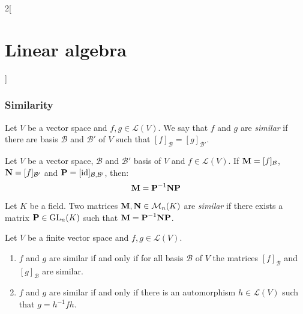\documentclass[../../../main.tex]{subfiles}
\begin{document}
\begin{multicols}{2}[\section{Linear algebra}]
  \subsubsection{Similarity}
  \begin{definition}
    Let $V$ be a vector space and $f,g\in\mathcal{L}(V)$. We say that $f$ and $g$ are \emph{similar} if there are basis $\mathcal{B}$ and $\mathcal{B}'$ of $V$ such that $[f]_\mathcal{B}=[g]_{\mathcal{B}'}$.
  \end{definition}
  \begin{lemma}
    Let $V$ be a vector space, $\mathcal{B}$ and $\mathcal{B}'$ basis of $V$ and $f\in\mathcal{L}(V)$. If $\boldsymbol{\mathrm{M}}=[f]_\mathcal{B}$, $\boldsymbol{\mathrm{N}}=[f]_{\mathcal{B}'}$ and $\boldsymbol{\mathrm{P}}=[\mathrm{id}]_{\mathcal{B},\mathcal{B}'}$, then: $$\boldsymbol{\mathrm{M}}=\boldsymbol{\mathrm{P}}^{-1}\boldsymbol{\mathrm{N}}\boldsymbol{\mathrm{P}}$$
  \end{lemma}
  \begin{definition}
    Let $K$ be a field. Two matrices $\boldsymbol{\mathrm{M}}, \boldsymbol{\mathrm{N}}\in\mathcal{M}_n(K)$ are \emph{similar} if there exists a matrix $\boldsymbol{\mathrm{P}}\in\mathrm{GL}_n(K)$ such that $\boldsymbol{\mathrm{M}}=\boldsymbol{\mathrm{P}}^{-1}\boldsymbol{\mathrm{N}}\boldsymbol{\mathrm{P}}$.
  \end{definition}
  \begin{proposition}
    Let $V$ be a finite vector space and $f,g\in\mathcal{L}(V)$.
    \begin{enumerate}
      \item $f$ and $g$ are similar if and only if for all basis $\mathcal{B}$ of $V$ the matrices $[f]_\mathcal{B}$ and $[g]_\mathcal{B}$ are similar.
      \item $f$ and $g$ are similar if and only if there is an automorphism $h\in\mathcal{L}(V)$ such that $g=h^{-1}fh$.
    \end{enumerate}
  \end{proposition}

\end{multicols}
\end{document}
